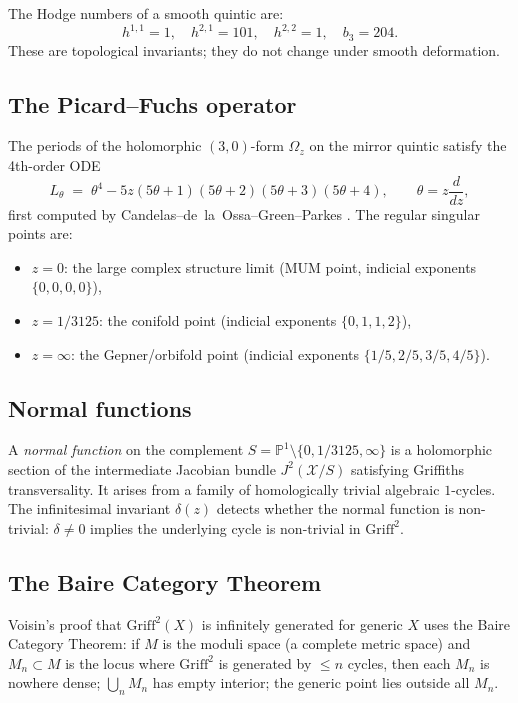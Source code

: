 \documentclass[11pt]{article}
\theoremstyle{plain}
\theoremstyle{definition}
\theoremstyle{remark}
\newcommand{\PP}{\mathbb{P}}
\newcommand{\Griff}{\mathrm{Griff}}
\begin{document}
The Hodge numbers of a smooth quintic are:
\[
h^{1,1} = 1, \quad h^{2,1} = 101, \quad h^{2,2} = 1, \quad b_3 = 204.
\]
These are topological invariants; they do not change under smooth deformation.

\subsection{The Picard--Fuchs operator}

The periods of the holomorphic $(3,0)$-form $\Omega_z$ on the mirror quintic satisfy the 4th-order ODE
\[
L_\theta \;=\; \theta^4 - 5z(5\theta+1)(5\theta+2)(5\theta+3)(5\theta+4), \qquad \theta = z\frac{d}{dz},
\]
first computed by Candelas--de~la~Ossa--Green--Parkes \cite{candelas-ossa-green-parkes}. The regular singular points are:
\begin{itemize}[nosep]
\item $z = 0$: the large complex structure limit (MUM point, indicial exponents $\{0,0,0,0\}$),
\item $z = 1/3125$: the conifold point (indicial exponents $\{0,1,1,2\}$),
\item $z = \infty$: the Gepner/orbifold point (indicial exponents $\{1/5, 2/5, 3/5, 4/5\}$).
\end{itemize}

\subsection{Normal functions}

A \emph{normal function} on the complement $S = \PP^1 \setminus \{0, 1/3125, \infty\}$ is a holomorphic section of the intermediate Jacobian bundle $J^2(\mathcal{X}/S)$ satisfying Griffiths transversality. It arises from a family of homologically trivial algebraic $1$-cycles. The infinitesimal invariant $\delta(z)$ detects whether the normal function is non-trivial: $\delta \neq 0$ implies the underlying cycle is non-trivial in $\Griff^2$.

\subsection{The Baire Category Theorem}

Voisin's proof that $\Griff^2(X)$ is infinitely generated for generic $X$ uses the Baire Category Theorem: if $M$ is the moduli space (a complete metric space) and $M_n \subset M$ is the locus where $\Griff^2$ is generated by $\leq n$ cycles, then each $M_n$ is nowhere dense; $\bigcup_n M_n$ has empty interior; the generic point lies outside all $M_n$.
\end{document}
